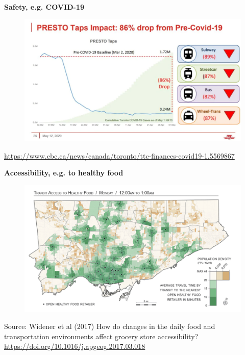 \documentclass[aspectratio=169]{beamer}
\begin{document}
\begin{frame}
	
	\textbf{Safety, e.g. COVID-19}
	
	\begin{figure}
		\centering
		\includegraphics[width=0.94\linewidth]{images/ttc-covid.png}
	\end{figure}
	
		\tiny \url{https://www.cbc.ca/news/canada/toronto/ttc-finances-covid19-1.5569867}
	
\end{frame}





\begin{frame}
	
	\textbf{Accessibility, e.g. to healthy food}
	
	\begin{figure}
		\centering
		\includegraphics[width=0.94\linewidth]{images/food_midnight.png}
	\end{figure}
	
	\tiny Source: Widener et al (2017) How do changes in the daily food and transportation environments affect grocery store accessibility?
	\url{https://doi.org/10.1016/j.apgeog.2017.03.018}
	
\end{frame}
\end{document}
